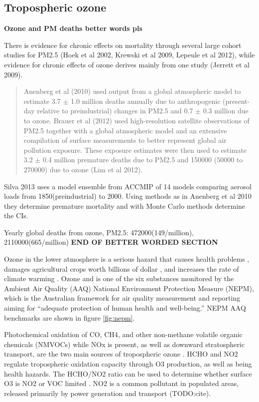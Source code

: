 \subsection{Tropospheric ozone}

\textbf{Ozone and PM deaths better words pls}

There is evidence for chronic effects on mortality through several large cohort studies for PM2.5 (Hoek et al 2002, Krewski et al 2009, Lepeule et al 2012), while evidence for chronic effects of ozone derives mainly from one study (Jerrett et al 2009). 

\begin{quote}
Anenberg et al (2010) used output from a global atmospheric model to estimate 3.7 $\pm$ 1.0 million deaths annually due to anthropogenic (present-day relative to preindustrial) changes in PM2.5 and 0.7 $\pm$ 0.3 million due to ozone. Brauer et al (2012) used high-resolution satellite observations of PM2.5 together with a global atmospheric model and an extensive compilation of surface measurements to better represent global air pollution exposure. These exposure estimates were then used to estimate 3.2 $\pm$ 0.4 million premature deaths due to PM2.5 and 150000 (50000 to 270000) due to ozone (Lim et al 2012).
\end{quote} \cite{Silva_2013}

Silva 2013 uses a model ensemble from ACCMIP of 14 models comparing aerosol loads from 1850(preindustrial) to 2000. Using methods as in Anenberg et al 2010 they determine premature mortality and with Monte Carlo methods determine the CIs.

Yearly global deaths from ozone, PM2.5:
472000(149/million), 2110000(665/million) \cite{Silva_2013}
\textbf{END OF BETTER WORDED SECTION}

Ozone in the lower atmosphere is a serious hazard that causes health problems \cite{Hsieh_2013}, damages agricultural crops worth billions of dollar \cite{Avnery_2011}, and increases the rate of climate warming \cite{IPCC_2013_chap8}. 
Ozone and is one of the six substances monitored by the Ambient Air Quality (AAQ) National Environment Protection Measure (NEPM), which is the Australian framework for air quality measurement and reporting aiming for ``adequate protection of human health and well-being.''
NEPM AAQ benchmarks are shown in figure \ref{fig:nepm}.

Photochemical oxidation of CO, CH4, and other non-methane volatile organic chemicals (NMVOCs) while NOx is present, as well as downward stratospheric transport, are the two main sources of tropospheric ozone \cite{Stevenson_2006}.
HCHO and NO2 regulate tropospheric oxidation capacity through O3 production, as well as being health hazards.
The HCHO/NO2 ratio can be used to determine whether surface O3 is NO2 or VOC limited \cite{Mahajan_2015}.
NO2 is a common pollutant in populated areas, released primarily by power generation and transport (TODO:cite). 

